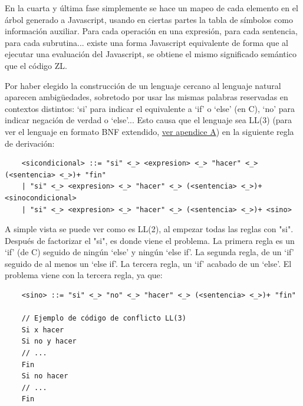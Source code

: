 \documentclass{report}
\begin{document}
	En la cuarta y última fase simplemente se hace un mapeo de cada elemento en el árbol generado a Javascript, usando en ciertas partes la tabla de símbolos como información auxiliar. Para cada operación en una expresión, para cada sentencia, para cada subrutina... existe una forma Javascript equivalente de forma que al ejecutar una evaluación del Javascript, se obtiene el mismo significado semántico que el código ZL. 
	
	
	
	Por haber elegido la construcción de un lenguaje cercano al lenguaje natural aparecen ambigüedades, sobretodo por usar las mismas palabras reservadas en contextos distintos: `si' para indicar el equivalente a `if' o `else' (en C), `no' para indicar negación de verdad o `else'... Esto causa que el lenguaje sea LL(3) (para ver el lenguaje en formato BNF extendido, \hyperref[app:a]{ver apendice A}) en la siguiente regla de derivación:
	
	\vspace{10px}
	
	
	\begin{verbatim}
	<sicondicional> ::= "si" <_> <expresion> <_> "hacer" <_> (<sentencia> <_>)+ "fin"
	| "si" <_> <expresion> <_> "hacer" <_> (<sentencia> <_>)+ <sinocondicional>
	| "si" <_> <expresion> <_> "hacer" <_> (<sentencia> <_>)+ <sino>
	\end{verbatim}
	
	A simple vista se puede ver como es LL(2), al empezar todas las reglas con "si". Después de factorizar el "si", es donde viene el problema. La primera regla es un `if' (de C) seguido de ningún `else' y ningún `else if'. La segunda regla, de un `if' seguido de al menos un `else if'. La tercera regla, un `if' acabado de un `else'. El problema viene con la tercera regla, ya que:
	
	\vspace{10px}
	
	\begin{BVerbatim}
	<sino> ::= "si" <_> "no" <_> "hacer" <_> (<sentencia> <_>)+ "fin"
	
	// Ejemplo de código de conflicto LL(3)
	Si x hacer
	Si no y hacer
	// ...
	Fin
	Si no hacer
	// ...
	Fin
	\end{BVerbatim}
	
	\vspace{10px}
	
\end{document}
